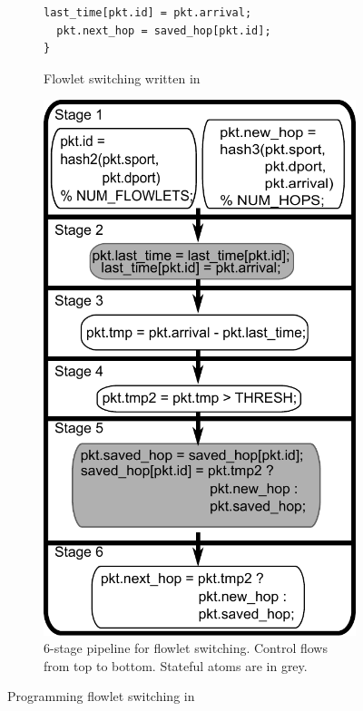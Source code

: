 \begin{figure}[!t]
\begin{subfigure}{0.6\textwidth}
\begin{small}
\begin{lstlisting}[style=customc]
  last_time[pkt.id] = pkt.arrival;
  pkt.next_hop = saved_hop[pkt.id];
}
\end{lstlisting}
\end{small}
\caption{Flowlet switching written in \pktlanguage}
\label{fig:flowlet_code}
\end{subfigure}
\begin{subfigure}{0.4\textwidth}
\includegraphics[width=\columnwidth]{domino_pipe.pdf}
\caption{6-stage \absmachine pipeline for flowlet
switching.  Control flows from top to bottom. Stateful atoms are in grey.}
\label{fig:flowlet_pipeline}
\end{subfigure}
\caption{Programming flowlet switching in \pktlanguage}
\vspace{-0.35in}
\end{figure}

